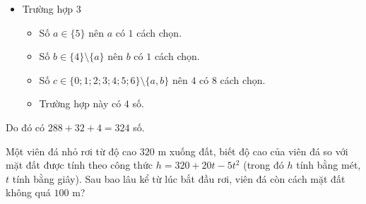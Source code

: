 \begin{bt}
{\begin{enumerate}
\begin{itemize}
			\item Trường hợp 3
				\begin{itemize}
				\item Số $a\in \{5\}$ nên $a$ có $1$ cách chọn.
				\item Số $b\in \{4\}\setminus \{a\}$ nên $b$ có  $1$ cách chọn.
				\item Số $c\in \{0;1;2;3;4;5;6\}\setminus \{a,b\}$ nên $4$ có  $8$ cách chọn.
				\item Trường hợp này có $4$ số.
			\end{itemize} 
		\end{itemize}	
		Do đó có $288+32+4=324$ số.
	\end{enumerate}
}
\end{bt}
\begin{bt}%
	Một viên đá nhỏ rơi từ độ cao $320$ m xuống đất, biết độ cao của viên đá so với mặt đất được tính theo công thức $h=320+20t-5t^2$ (trong đó $h$ tính bằng mét, $t$ tính bằng giây). Sau bao lâu kể từ lúc bắt đầu rơi, viên đá còn cách mặt đất không quá $100$ m?
\end{bt}


